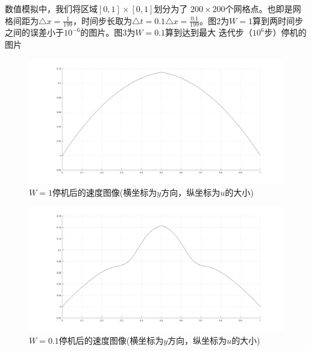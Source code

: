 \documentclass[11pt,UTF8]{ctexart}
\begin{document}
    \par{数值模拟中，我们将区域$[0,1]\times[0,1]$划分为了
    $200\times 200$个网格点。也即是网格间距为$\triangle x
    =\frac{1}{199}$，时间步长取为$\triangle t=0.1
    \triangle x=\frac{0.1}{199}$。图2为$W=1$算到两时间步
    之间的误差小于$10^{-6}$的图片。图3为$W=0.1$算到达到最大
    迭代步（$10^{6}$步）停机的图片
    }
    \begin{figure}[h]
        \includegraphics[width=\textwidth]{W=1.png}
        \caption{$W=1$停机后的速度图像(横坐标为$y$方向，纵坐标为$u$的大小)}
    \end{figure}
    \begin{figure}[h]
        \includegraphics[width=\textwidth]{W=01.png}
        \caption{$W=0.1$停机后的速度图像(横坐标为$y$方向，纵坐标为$u$的大小)}
    \end{figure}
\end{document}
